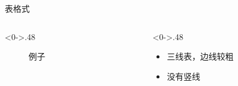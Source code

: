 \documentclass[utf8,dvipsnames,aspectratio=169]{beamer}
\begin{document}
\begin{frame}{表格式}
	\begin{columns}
	\begin{column}<0->{.48\textwidth}
		\begin{figure}[thpb]
			\centering
			\caption{例子}
			\label{fig:ex-tbl}
		\end{figure}
	\end{column}
	\begin{column}<0->{.48\textwidth}
		\begin{itemize}
			\item<1-> 三线表，边线较粗
			\item<1-> 没有竖线
		\end{itemize}
	\end{column}
	\end{columns}
\end{frame}
\end{document}
